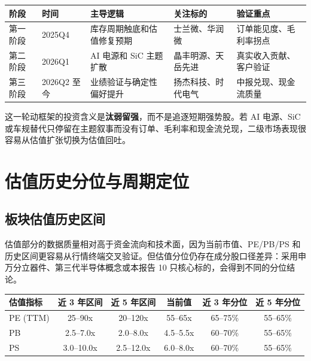\begin{exhibitbox}[表 9-2：功率半导体板块三阶段轮动框架]
\centering
\small
\begin{tabularx}{\exhibitboxwidth}{L{1.8cm} L{1.8cm} X L{2.8cm} L{2.8cm}}
\toprule
\textbf{阶段} & \textbf{时间} & \textbf{主导逻辑} & \textbf{关注标的} & \textbf{验证重点} \\
\midrule
第一阶段 & 2025Q4 & 库存周期触底和估值修复预期 & 士兰微、华润微 & 订单能见度、毛利率拐点 \\
第二阶段 & 2026Q1 & AI 电源和 SiC 主题扩散 & 晶丰明源、天岳先进 & 真实收入贡献、客户验证 \\
第三阶段 & 2026Q2 至今 & 业绩验证与确定性偏好提升 & 扬杰科技、时代电气 & 中报兑现、现金流质量 \\
\bottomrule
\end{tabularx}
\end{exhibitbox}

这一轮动框架的投资含义是\textbf{汰弱留强}，而不是追逐短期强势股。若 AI 电源、SiC 或车规替代只停留在主题叙事而没有订单、毛利率和现金流兑现，二级市场表现很容易从估值扩张切换为估值回吐。

\section{估值历史分位与周期定位}

\subsection{板块估值历史区间}

估值部分的数据质量相对高于资金流向和技术面，因为当前市值、PE/PB/PS 和历史区间更容易从行情终端交叉验证。但估值分位仍存在成分股口径差异：采用申万分立器件、第三代半导体概念或本报告 10 只核心标的，会得到不同的分位结论。

\begin{exhibitbox}[表 9-3：功率半导体板块估值历史分位]
\centering
\small
\begin{tabularx}{\exhibitboxwidth}{L{2.0cm} c c c c c}
\toprule
\textbf{估值指标} & \textbf{近 3 年区间} & \textbf{近 5 年区间} & \textbf{当前值} & \textbf{近 3 年分位} & \textbf{近 5 年分位} \\
\midrule
PE (TTM) & 25--90x & 20--120x & 55--65x & 65--75\% & 55--65\% \\
PB & 2.5--7.0x & 2.0--8.0x & 4.5--5.5x & 60--70\% & 55--65\% \\
PS & 3.0--10.0x & 2.5--12.0x & 6.0--8.0x & 60--70\% & 55--65\% \\
\bottomrule
\end{tabularx}
\end{exhibitbox}

